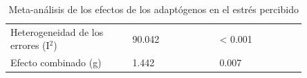\begin{table}[H]

\caption{Meta-análisis de los efectos de los adaptógenos en el estrés percibido}
\label{tab:meta_análisis_efetos_adaptógenos_PSS}

\begin{threeparttable}

{\small{}

\begin{tabular}{M{0.35\linewidth}M{0.25\linewidth}M{0.25\linewidth}}\hline

    \theader{} &  &  \\ \hline
    
    Heterogeneidad de los errores (I$^{2}$) & 90.042 & < 0.001 \\
    Efecto combinado (g) & 1.442 & 0.007 \\

    \hline
\end{tabular}

}

\begin{tablenotes}\tiny %
    \item[] 
\end{tablenotes}

\end{threeparttable}
\end{table}